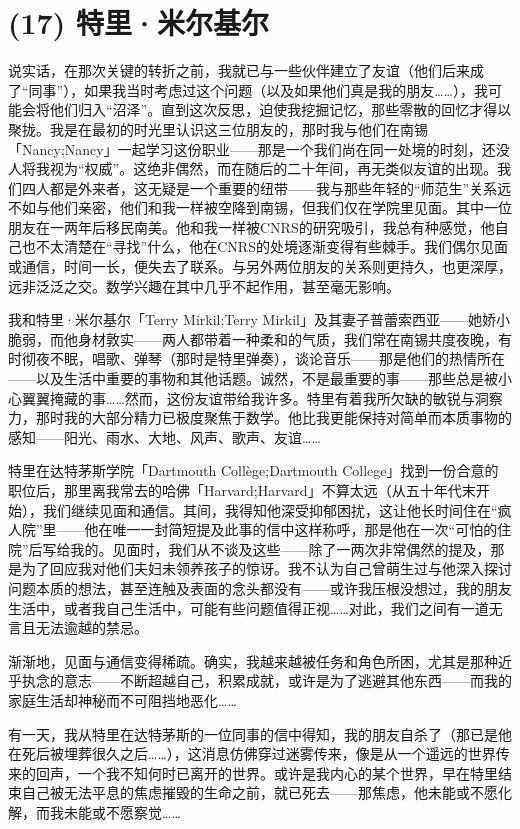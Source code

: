 \section{(17) 特里·米尔基尔}

说实话，在那次关键的转折之前，我就已与一些伙伴建立了友谊（他们后来成了“同事”），如果我当时考虑过这个问题（以及如果他们真是我的朋友……），我可能会将他们归入“沼泽”。直到这次反思，迫使我挖掘记忆，那些零散的回忆才得以聚拢。我是在最初的时光里认识这三位朋友的，那时我与他们在南锡「Nancy;Nancy」一起学习这份职业——那是一个我们尚在同一处境的时刻，还没人将我视为“权威”。这绝非偶然，而在随后的二十年间，再无类似友谊的出现。我们四人都是外来者，这无疑是一个重要的纽带——我与那些年轻的“师范生”关系远不如与他们亲密，他们和我一样被空降到南锡，但我们仅在学院里见面。其中一位朋友在一两年后移民南美。他和我一样被CNRS的研究吸引，我总有种感觉，他自己也不太清楚在“寻找”什么，他在CNRS的处境逐渐变得有些棘手。我们偶尔见面或通信，时间一长，便失去了联系。与另外两位朋友的关系则更持久，也更深厚，远非泛泛之交。数学兴趣在其中几乎不起作用，甚至毫无影响。

我和特里·米尔基尔「Terry Mirkil;Terry Mirkil」及其妻子普蕾索西亚——她娇小脆弱，而他身材敦实——两人都带着一种柔和的气质，我们常在南锡共度夜晚，有时彻夜不眠，唱歌、弹琴（那时是特里弹奏），谈论音乐——那是他们的热情所在——以及生活中重要的事物和其他话题。诚然，不是最重要的事——那些总是被小心翼翼掩藏的事……然而，这份友谊带给我许多。特里有着我所欠缺的敏锐与洞察力，那时我的大部分精力已极度聚焦于数学。他比我更能保持对简单而本质事物的感知——阳光、雨水、大地、风声、歌声、友谊……

特里在达特茅斯学院「Dartmouth Collège;Dartmouth College」找到一份合意的职位后，那里离我常去的哈佛「Harvard;Harvard」不算太远（从五十年代末开始），我们继续见面和通信。其间，我得知他深受抑郁困扰，这让他长时间住在“疯人院”里——他在唯一一封简短提及此事的信中这样称呼，那是他在一次“可怕的住院”后写给我的。见面时，我们从不谈及这些——除了一两次非常偶然的提及，那是为了回应我对他们夫妇未领养孩子的惊讶。我不认为自己曾萌生过与他深入探讨问题本质的想法，甚至连触及表面的念头都没有——或许我压根没想过，我的朋友生活中，或者我自己生活中，可能有些问题值得正视……对此，我们之间有一道无言且无法逾越的禁忌。

渐渐地，见面与通信变得稀疏。确实，我越来越被任务和角色所困，尤其是那种近乎执念的意志——不断超越自己，积累成就，或许是为了逃避其他东西——而我的家庭生活却神秘而不可阻挡地恶化……

有一天，我从特里在达特茅斯的一位同事的信中得知，我的朋友自杀了（那已是他在死后被埋葬很久之后……），这消息仿佛穿过迷雾传来，像是从一个遥远的世界传来的回声，一个我不知何时已离开的世界。或许是我内心的某个世界，早在特里结束自己被无法平息的焦虑摧毁的生命之前，就已死去——那焦虑，他未能或不愿化解，而我未能或不愿察觉……